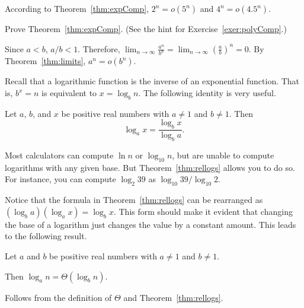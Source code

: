 \begin{exa}
According to Theorem~\ref{thm:expComp}, $2^n=o(5^n)$ and $4^n=o(4.5^n)$.
\end{exa}

\begin{exer}
Prove Theorem~\ref{thm:expComp}.
(See the hint for Exercise~\ref{exer:polyComp}.)

\vspace*{2in}
\begin{answer}
Since $a<b$, $a/b<1$.  
Therefore, $\displaystyle \lim_{n\rightarrow\infty} \frac{a^n}{b^n} 
=  \lim_{n\rightarrow\infty}\left(\frac{a}{b}\right)^n = 0$.
By Theorem~\ref{thm:limits}, $a^n=o(b^n)$.
\end{answer}
\end{exer}


\newpage

Recall that a logarithmic function is the inverse of an exponential function.
That is, $b^{x} = n$ is equivalent to $x = \log_{b} n$.
The following identity is very useful.

\begin{thm}\label{thm:rellogs}
Let $a$, $b$, and $x$ be positive real numbers with $a\neq 1$ and $b\neq 1$.  Then 
$$\log_a x = \frac{\log_b x}{\log_b a}.$$
\end{thm}

\begin{exa}
Most calculators can compute $\ln n$ or $\log_{10} n$, but are unable to compute
logarithms with any given base.  But Theorem~\ref{thm:rellogs} allows you to do so.
For instance, you can compute $\log_2 39$ as $\log_{10} 39/\log_{10} 2$.
\end{exa}

Notice that the formula in Theorem~\ref{thm:rellogs}  can be rearranged as 
$(\log_b a)(\log_a x) = \log_b x.$
This form should make it evident that 
changing the base of a logarithm just changes the value
by a constant amount.  This leads to the following result.
\begin{cor}\label{cor:thetalogs}
Let $a$ and $b$ be positive real numbers with $a\neq 1$ and $b\neq 1$.

\noindent
Then $\log_a n=\Theta(\log_b n)$.
\begin{pf}
Follows from the definition of $\Theta$ and
Theorem~\ref{thm:rellogs}.
\end{pf}
\end{cor}

